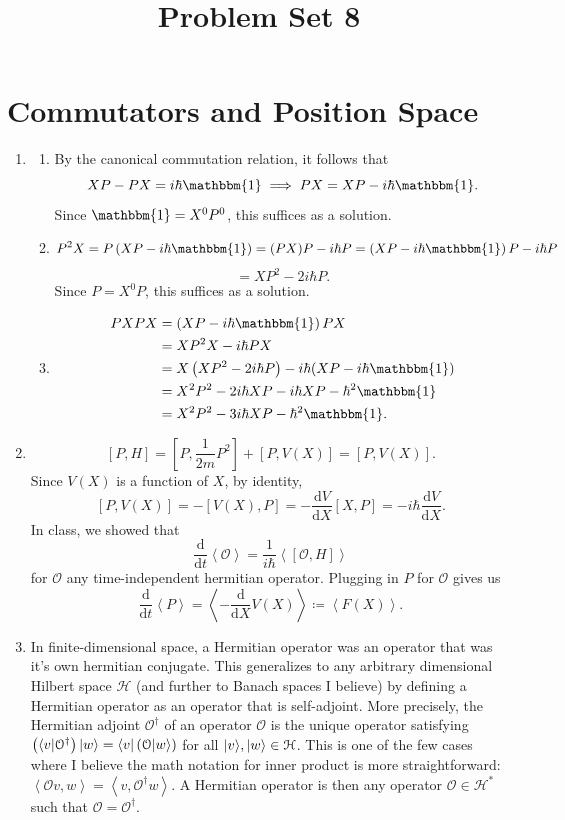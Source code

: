 \documentclass[11pt, letterpaper]{article}
\title{Problem Set 8}
\begin{document}
\makeproblem
\section{Commutators and Position Space}
\begin{enumerate}
	\item 
		\begin{enumerate}
			\item By the canonical commutation relation, it follows that
				\[
					XP-PX=i\hbar\mathbbm{1} \implies PX=XP-i\hbar \mathbbm{1}
				.\]
				Since $\mathbbm{1}=X^0P^0$, this suffices as a solution.
			\item 
				\[
					P^2X=P\left( XP-i\hbar \mathbbm{1} \right) =(PX)P-i\hbar P=\left( XP-i\hbar \mathbbm{1} \right) P-i\hbar P
				\]
				\[
					=XP^2-2i\hbar P
				.\]
				Since $P=X^0P$, this suffices as a solution.
			\item 
				\begin{align*}
					PXPX&=\left( XP-i\hbar \mathbbm{1} \right)PX \\
					    &=XP^2X-i\hbar PX\\
					    &=X\left( XP^2-2i\hbar P \right) -i\hbar (XP-i\hbar \mathbbm{1})\\
					    &=X^2P^2-2i\hbar XP-i\hbar XP-\hbar^2 \mathbbm{1}\\
					    &=X^2P^2-3i\hbar XP-\hbar^2 \mathbbm{1}
				.\end{align*}
		\end{enumerate}
	\item 
		\[
			[P,H]=\left[ P,\frac{1}{2m} P^2 \right] +\left[ P,V(X) \right]=\left[ P,V(X) \right] 
		.\]
		Since $V(X)$ is a function of $X$, by identity,
		\[
			\left[ P,V\left( X \right)  \right] =-\left[ V(X),P \right] =-\frac{\mathrm{d}V}{\mathrm{d}X} \left[ X,P \right] =-i\hbar \frac{\mathrm{d}V}{\mathrm{d}X} 
		.\]
		In class, we showed that
		\[
			\frac{\mathrm{d}}{\mathrm{d}t} \left\langle \mathcal{O}  \right\rangle =\frac{1}{i\hbar }\left< \left[ \mathcal{O} ,H \right] \right>
		\]
		for $\mathcal{O} $ any time-independent hermitian operator. Plugging in $P$ for $\mathcal{O} $ gives us
		\[
			\frac{\mathrm{d}}{\mathrm{d}t} \left\langle P \right\rangle =\left\langle -\frac{\mathrm{d}}{\mathrm{d}X} V(X) \right\rangle \coloneqq \left\langle F(X) \right\rangle 
		.\]
	\item In finite-dimensional space, a Hermitian operator was an operator that was it's own hermitian conjugate. This generalizes to any arbitrary dimensional Hilbert space $\mathcal{H} $ (and further to Banach spaces I believe) by defining a Hermitian operator as an operator that is self-adjoint. More precisely, the Hermitian adjoint $\mathcal{O} ^{\dagger} $ of an operator $\mathcal{O} $ is the unique operator satisfying $\left( \langle v\rvert \mathcal{O} ^{\dagger}  \right) \lvert w\rangle =\langle v\rvert \left( \mathcal{O} \lvert w\rangle  \right) $ for all $\lvert v\rangle ,\lvert w\rangle \in \mathcal{H} $. This is one of the few cases where I believe the math notation for inner product is more straightforward: $\left\langle \mathcal{O} v,w \right\rangle =\left\langle v,\mathcal{O} ^{\dagger} w \right\rangle $. A Hermitian operator is then any operator $\mathcal{O} \in \mathcal{H} ^*$ such that $\mathcal{O} =\mathcal{O} ^{\dagger} $.


\end{enumerate}
\end{document}
